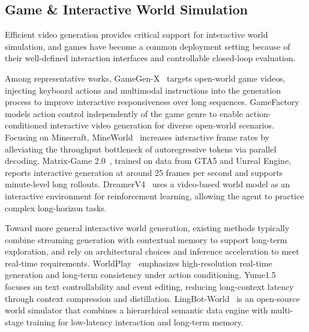\documentclass[lettersize,journal]{IEEEtran}
\begin{document}
\subsection{Game \& Interactive World Simulation}
Efficient video generation provides critical support for interactive world simulation, and games have become a common deployment setting because of their well-defined interaction interfaces and controllable closed-loop evaluation. 

Among representative works, GameGen-X~\cite{che2024gamegen} targets open-world game videos, injecting keyboard actions and multimodal instructions into the generation process to improve interactive responsiveness over long sequences. GameFactory~\cite{yu2025gamefactory} models action control independently of the game genre to enable action-conditioned interactive video generation for diverse open-world scenarios. Focusing on Minecraft, MineWorld~\cite{guo2025mineworld} increases interactive frame rates by alleviating the throughput bottleneck of autoregressive tokens via parallel decoding. Matrix-Game 2.0~\cite{he2025matrix}, trained on data from GTA5 and Unreal Engine, reports interactive generation at around 25 frames per second and supports minute-level long rollouts. 
DreamerV4~\cite{hafner2025dreamerv4} uses a video-based world model as an interactive environment for reinforcement learning, allowing the agent to practice complex long-horizon tasks.

Toward more general interactive world generation, existing methods typically combine streaming generation with contextual memory to support long-term exploration, and rely on architectural choices and inference acceleration to meet real-time requirements. WorldPlay~\cite{sun2025worldplay} emphasizes high-resolution real-time generation and long-term consistency under action conditioning. Yume1.5~\cite{mao2025yume} focuses on text controllability and event editing, reducing long-context latency through context compression and distillation. LingBot-World~\cite{robbyantteam2026advancingopensourceworldmodels} is an open-source world simulator that combines a hierarchical semantic data engine with multi-stage training for low-latency interaction and long-term memory. 
\end{document}
